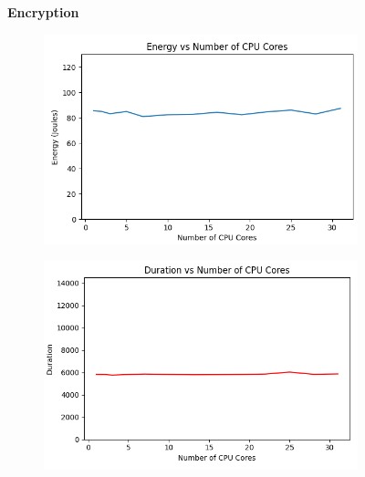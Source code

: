 \documentclass[times, 10pt,twocolumn]{article}
\begin{document}
\begin{figure}[ht]
   \textbf{Encryption}\par\medskip
   \begin{subfigure}[b]{0.3\textwidth}
      \includegraphics[width=\textwidth]{imgs/study_1_results/var_cpu/encryption/CPU_Energy.png}
     \caption{}
     \label{fig:plot7}
   \end{subfigure}
   \hfill
   \begin{subfigure}[b]{0.3\textwidth}
      \includegraphics[width=\textwidth]{imgs/study_1_results/var_cpu/encryption/CPU_Duration.png}
     \caption{}
     \label{fig:plot8}
   \end{subfigure}
   \hfill
   \begin{subfigure}[b]{0.3\textwidth}

\end{subfigure}
\end{figure}
\end{document}
